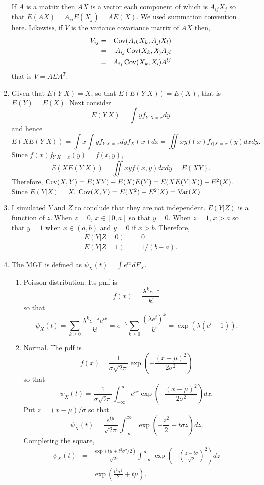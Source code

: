 \documentclass{article}
\begin{document}
\begin{enumerate}
If $A$ is a matrix then $AX$ is a vector each component of which is $A_{ij}X_j$
so that $E(AX) = A_{ij}E(X_j) = AE(X)$. We used summation convention here. 
Likewise, if $V$ is the variance covariance matrix of $AX$ then,
\begin{eqnarray*}
V_{ij} &=& \operatorname{Cov}(A_{ik}X_k, A_{jl}X_l) \\
 &=& A_{ij}\operatorname{Cov}(X_k, X_)A_{jl} \\
 &=& A_{ij}\operatorname{Cov}(X_k, X_l)A^{lj} 
\end{eqnarray*}
that is $V = A\Sigma A^T$.

\item Given that $E(Y|X)=X$, so that $E(E(Y|X)) = E(X)$, that is $E(Y) = E(X)$.
Next consider
\[
E(Y|X) = \int y f_{Y|X=x}dy
\]
and hence
\[
E(XE(Y|X)) = \int x \int y f_{Y|X=x}dy f_X(x)dx = \iint xy f(x)f_{Y|X=x}(y)dxdy.
\]
Since $f(x)f_{Y|X=x}(y) = f(x, y)$,
\[
E(XE(Y|X)) = \iint xy f(x, y)dxdy = E(XY).
\]
Therefore, $\operatorname{Cov}(X, Y) = E(XY) - E(X)E(Y) = E(XE(Y|X)) - E^2(X)$. Since $E(Y|X)
= X$, $\operatorname{Cov}(X, Y) = E(X^2) - E^2(X) = \operatorname{Var}(X)$.

\item I simulated $Y$ and $Z$ to conclude that they are not independent.
$E(Y|Z)$ is a function of $z$. When $z = 0$, $x \in [0, a]$ so that $y = 0$.
When $z = 1$, $x > a$ so that $y = 1$ when $x \in (a, b)$ and $y = 0$ if $x > b$.
Therefore,
\begin{eqnarray*}
E(Y|Z=0) &=& 0 \\
E(Y|Z=1) &=& 1/(b - a).
\end{eqnarray*}

\item The MGF is defined as $\psi_X(t) = \int e^{tx}dF_X$.
\begin{enumerate}
\item Poisson distribution. Its pmf is
\[
f(x) = \frac{\lambda^k e^{-\lambda}}{k!}
\]
so that
\[
\psi_X(t) = \sum_{k \ge 0}\frac{\lambda^k e^{-\lambda}e^{tk}}{k!} =
e^{-\lambda}\sum_{k \ge 0}\frac{(\lambda e^t)^k}{k!} = \exp(\lambda(e^t - 1)).
\]

\item Normal. The pdf is
\[
f(x) = \frac{1}{\sigma\sqrt{2\pi}}\exp\left(-\frac{(x-\mu)^2}{2\sigma^2}\right)
\]
so that
\[
\psi_X(t) = \frac{1}{\sigma\sqrt{2\pi}}\int_{-\infty}^\infty 
e^{tx}\exp\left(-\frac{(x-\mu)^2}{2\sigma^2}\right)dx.
\]
Put $z = (x - \mu)/\sigma$ so that
\[
\psi_X(t) = \frac{e^{t\mu}}{\sqrt{2\pi}}\int_{-\infty}^\infty
\exp\left(-\frac{z^2}{2} + t\sigma z\right)dz.
\]
Completing the square,
\begin{eqnarray*}
\psi_X(t) &=& \frac{\exp(t\mu + t^2\sigma^2/2)}{\sqrt{2\pi}}\int_{-\infty}^\infty
\exp\left(-\left(\frac{z - t\sigma}{\sqrt{2}}\right)^2\right)dz \\
 &=& \exp\left(\frac{t^2\sigma^2}{2} + t\mu\right).
\end{eqnarray*}


\end{enumerate}
\end{enumerate}
\end{document}
